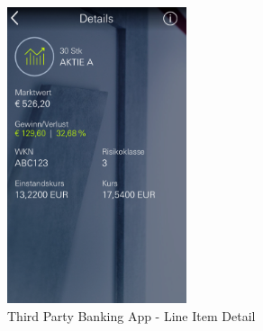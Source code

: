 \begin{figure}[H] 
        \centering\includegraphics[width=0.47\textwidth]{img/screenshots/ex4p5.png}
	\captionsetup{labelformat=empty}
        \caption[]{Third Party Banking App - Line Item Detail}
\end{figure}
